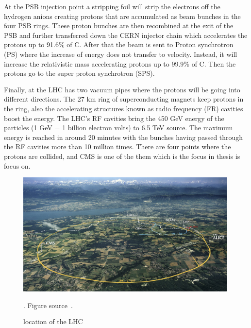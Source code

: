 At the PSB injection point a stripping foil will strip the electrons off the hydrogen anions creating protons that are accumulated as beam bunches in the four PSB rings. These proton bunches are then recombined at the exit of the PSB and further transferred down the CERN injector chain which accelerates the protons up to 91.6\% of C. After that the beam is sent to Proton synchrotron (PS) where the increase of energy does not transfer to velocity. Instead, it will increase the relativistic mass accelerating protons up to 99.9\% of C. Then the protons go to the super proton synchrotron (SPS).

Finally, at the LHC has two vacuum pipes where the protons will be going into different directions. The 27 km ring of superconducting magnets keep protons in the ring, also the accelerating structures known as radio frequency (FR) cavities boost the energy. The LHC’s RF cavities bring the 450 GeV energy of the particles (1 GeV = 1 billion electron volts) to 6.5 TeV source.
The maximum energy is reached in around 20 minutes with the bunches having passed through the RF cavities more than 10 million times.
There are four  points where the protons are collided, and CMS is one of the them which is the focus in thesis is focus on. 

\begin{figure}[t!]
\centering
\includegraphics[width=0.99\textwidth]{figures/LHC_location.png}
\caption[location of the LHC]{location of the LHC}. Figure source~\cite{SMtable}.
\label{fig:LHC_location}
\end{figure}

